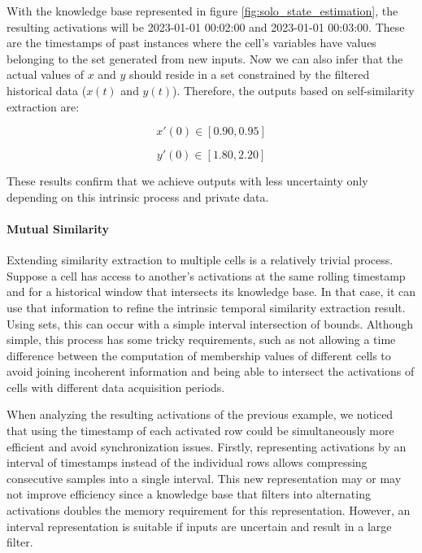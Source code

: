With the knowledge base represented in figure \ref{fig:solo_state_estimation}, the resulting activations will be 2023-01-01 00:02:00 and 2023-01-01 00:03:00. These are the timestamps of past instances where the cell's variables have values belonging to the set generated from new inputs. Now we can also infer that the actual values of $x$ and $y$ should reside in a set constrained by the filtered historical data ($x(t)$ and $y(t)$). Therefore, the outputs based on self-similarity extraction are:

\begin{equation}
    x'(0) \in [0.90, 0.95]
\end{equation}

\begin{equation}
    y'(0) \in [1.80, 2.20]
\end{equation}

These results confirm that we achieve outputs with less uncertainty only depending on this intrinsic process and private data.

\paragraph{Mutual Similarity}

Extending similarity extraction to multiple cells is a relatively trivial process. Suppose a cell has access to another's activations at the same rolling timestamp and for a historical window that intersects its knowledge base. In that case, it can use that information to refine the intrinsic temporal similarity extraction result. Using sets, this can occur with a simple interval intersection of bounds. Although simple, this process has some tricky requirements, such as not allowing a time difference between the computation of membership values of different cells to avoid joining incoherent information and being able to intersect the activations of cells with different data acquisition periods.


When analyzing the resulting activations of the previous example, we noticed that using the timestamp of each activated row could be simultaneously more efficient and avoid synchronization issues. Firstly, representing activations by an interval of timestamps instead of the individual rows allows compressing consecutive samples into a single interval.
This new representation may or may not improve efficiency since a knowledge base that filters into alternating activations doubles the memory requirement for this representation. However, an interval representation is suitable if inputs are uncertain and result in a large filter.


